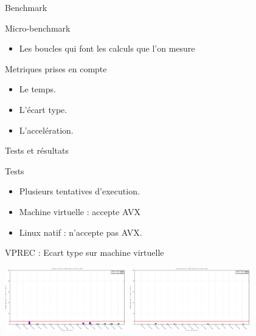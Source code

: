\documentclass{beamer}
\begin{document}
\begin{frame}{Benchmark}
    \begin{block}{Micro-benchmark}
      \begin{itemize}
          \item Les boucles qui font les calculs que l'on mesure 
          
      \end{itemize}
    \end{block}
  \begin{block}{Metriques prises en compte}
 
        \begin{itemize}

            
            \item Le temps.
            \item L'écart type.
            \item L'accelération.
           
        \end{itemize}
  \end{block}
\end{frame}

\begin{frame}{Tests et résultats}

  \begin{block}{Tests}
 
        \begin{itemize}

            \item Plusieurs tentatives d'execution.
            \item Machine virtuelle : accepte AVX
            \item Linux natif : n'accepte pas AVX.
           
           
        \end{itemize}
  \end{block}
\end{frame}



\begin{frame}{VPREC : Ecart type sur machine virtuelle}
    

   
 \centering\includegraphics[width=200px]{../ressources/vm_vprec_normal_stddev.png}
  \centering\includegraphics[width=200px]{../ressources/vm_vprec_denormal_stddev.png}
    
\end{frame}
\end{document}
